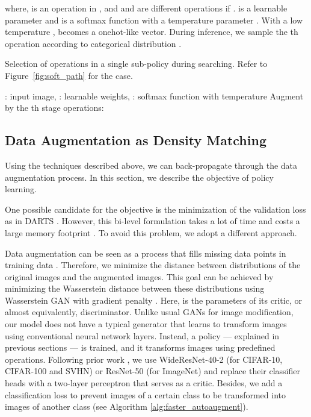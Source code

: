 \documentclass[10pt,twocolumn,letterpaper]{article}
\def\Figref#1{Figure~\ref{#1}}
\begin{document}
\noindent where,  is an operation in , and  and  are different operations if .  is a learnable parameter and  is a softmax function  with a temperature parameter . With a low temperature ,  becomes a onehot-like vector. During inference, we sample the th operation according to categorical distribution .


\begin{algorithm}
\caption{Selection of operations in a single sub-policy during searching. Refer to \Figref{fig:soft_path} for the   case.}
\label{alg:combination}

\begin{algorithmic}
    \Statex : input image, 
    \Statex : learnable weights, 
    \Statex : softmax function with temperature 
        \State Augment  by the th stage operations: 
        
        
    \EndFor
    \Return 
\end{algorithmic}
\end{algorithm}



\subsection{Data Augmentation as Density Matching}\label{sub:density_matching}

Using the techniques described above, we can back-propagate through the data augmentation process. In this section, we describe the objective of policy learning.

One possible candidate for the objective is the minimization of the validation loss as in DARTS \cite{Liu2018c}. However, this bi-level formulation takes a lot of time and costs a large memory footprint \cite{Finn2017b}. To avoid this problem, we adopt a different approach.

Data augmentation can be seen as a process that fills missing data points in training data \cite{Lim2019,Ratner2017a,Tran2017a}. Therefore, we minimize the distance between distributions of the original images and the augmented images. This goal can be achieved by minimizing the Wasserstein distance between these distributions  using Wasserstein GAN \cite{Arjovsky2017b} with gradient penalty \cite{Gulrajani2017}. Here,  is the parameters of its critic, or almost equivalently, discriminator. 
Unlike usual GANs for image modification, our model does not have a typical generator that learns to transform images using conventional neural network layers. Instead, a policy --- explained in previous sections --- is trained, and it transforms images using predefined operations.
Following prior work \cite{Cubuk2018,Ho2019,Lim2019}, we use WideResNet-40-2 \cite{Zagoruyko} (for CIFAR-10, CIFAR-100 and SVHN) or ResNet-50 \cite{He2016b} (for ImageNet) and replace their classifier heads with a two-layer perceptron  that serves as a critic. Besides, we add a classification loss to prevent images of a certain class to be transformed into images of another class (see Algorithm \ref{alg:faster_autoaugment}).
\end{document}
